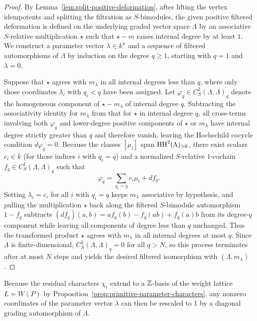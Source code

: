 \begin{proof}
By Lemma~\ref{lem:split-positive-deformation}, after lifting the vertex
idempotents and splitting the filtration as $S$-bimodules, the given positive
filtered deformation is defined on the underlying graded vector space
$\Lambda$ by an associative $S$-relative multiplication $\star$ such that
$\star-m$ raises internal degree by at least $1$. We construct a parameter
vector $\lambda\in k^n$ and a sequence of filtered automorphisms of $\Lambda$
by induction on the degree $q\geq1$, starting with $q=1$ and $\lambda=0$.

Suppose that $\star$ agrees with $m_\lambda$ in all internal degrees less
than $q$, where only those coordinates $\lambda_i$ with $q_i<q$ have been
assigned. Let $\varphi_q\in C^2_S(\Lambda,\Lambda)_q$ denote the homogeneous
component of $\star-m_\lambda$ of internal degree $q$. Subtracting the
associativity identity for $m_\lambda$ from that for $\star$ in internal
degree $q$, all cross-terms involving both $\varphi_q$ and lower-degree
positive components of $\star$ or $m_\lambda$ have internal degree strictly
greater than $q$ and therefore vanish, leaving the Hochschild cocycle
condition $d\varphi_q=0$. Because the classes $[\mu_i]$ span
$\operatorname{HH}^2(\Lambda)_{>0}$, there exist scalars $c_i\in k$ (for those indices $i$
with $q_i=q$) and a normalized $S$-relative $1$-cochain
$f_q\in C^1_S(\Lambda,\Lambda)_q$ such that
\[
                 \varphi_q=\sum_{q_i=q}c_i\mu_i+df_q.
\]
Setting $\lambda_i=c_i$ for all $i$ with $q_i=q$ keeps $m_\lambda$
associative by hypothesis, and pulling the multiplication $\star$ back along
the filtered $S$-bimodule automorphism $1-f_q$ subtracts
$(df_q)(a,b)=a f_q(b)-f_q(ab)+f_q(a)b$ from its degree-$q$ component while
leaving all components of degree less than $q$ unchanged. Thus the
transformed product $\star$ agrees with $m_\lambda$ in all internal degrees
at most $q$. Since $\Lambda$ is finite-dimensional, $C^2_S(\Lambda,\Lambda)_q=0$
for all $q>N$, so this process terminates after at most $N$ steps and yields
the desired filtered isomorphism with $(\Lambda,m_\lambda)$.
\end{proof}

Because the residual characters $\chi_i$ extend to a $\mathbb Z$-basis of the
weight lattice $L=W(P)$ by Proposition~\ref{prop:primitive-parameter-characters},
any nonzero coordinates of the parameter vector $\lambda$ can then be rescaled
to $1$ by a diagonal grading automorphism of $\Lambda$.

